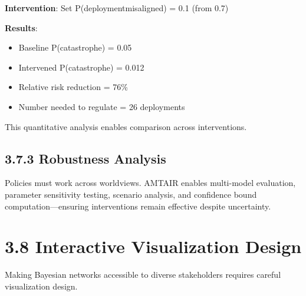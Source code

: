 \documentclass[
  11pt,
  letterpaper,
]{book}
\providecommand{\tightlist}{%
  \setlength{\itemsep}{0pt}\setlength{\parskip}{0pt}}
\begin{document}
\textbf{Intervention}: Set P(deployment\textbar misaligned) = 0.1 (from
0.7)

\textbf{Results}:

\begin{itemize}
\tightlist
\item
  Baseline P(catastrophe) = 0.05
\item
  Intervened P(catastrophe) = 0.012
\item
  Relative risk reduction = 76\%
\item
  Number needed to regulate = 26 deployments
\end{itemize}

This quantitative analysis enables comparison across interventions.

\subsection*{3.7.3 Robustness Analysis}\label{sec-robustness}

\begin{tcolorbox}[enhanced jigsaw, opacityback=0, leftrule=.75mm, breakable, coltitle=black, colbacktitle=quarto-callout-tip-color!10!white, bottomrule=.15mm, rightrule=.15mm, toprule=.15mm, left=2mm, bottomtitle=1mm, arc=.35mm, toptitle=1mm, titlerule=0mm, title=\textcolor{quarto-callout-tip-color}{\faLightbulb}\hspace{0.5em}{Cross-Worldview Robustness}, opacitybacktitle=0.6, colframe=quarto-callout-tip-color-frame, colback=white]

Policies must work across worldviews. AMTAIR enables multi-model
evaluation, parameter sensitivity testing, scenario analysis, and
confidence bound computation---ensuring interventions remain effective
despite uncertainty.

\end{tcolorbox}

\section*{3.8 Interactive Visualization
Design}\label{sec-visualization-design}


Making Bayesian networks accessible to diverse stakeholders requires
careful visualization design.
\end{document}
